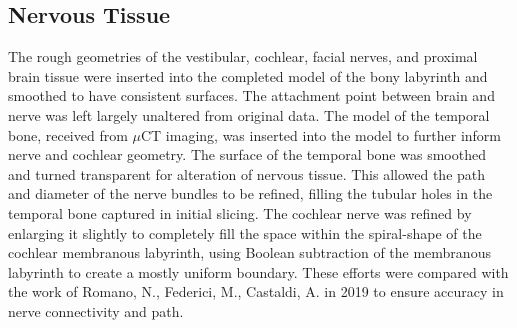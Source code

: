 \documentclass[12pt]{article}
\begin{document}
\subsection{Nervous Tissue}
The rough geometries of the vestibular, cochlear, facial nerves, and proximal brain tissue were inserted into the completed model of the bony labyrinth and smoothed to have consistent surfaces. The attachment point between brain and nerve was left largely unaltered from original data. The model of the temporal bone, received from $\mu$CT imaging, was inserted into the model to further inform nerve and cochlear geometry. The surface of the temporal bone was smoothed and turned transparent for alteration of nervous tissue. This allowed the path and diameter of the nerve bundles to be refined, filling the tubular holes in the temporal bone captured in initial slicing. The cochlear nerve was refined by enlarging it slightly to completely fill the space within the spiral-shape of the cochlear membranous labyrinth, using Boolean subtraction of the membranous labyrinth to create a mostly uniform boundary. These efforts were compared with the work of Romano, N., Federici, M., Castaldi, A. in 2019 to ensure accuracy in nerve connectivity and path. \cite{romano:nerves}
 
\end{document}
